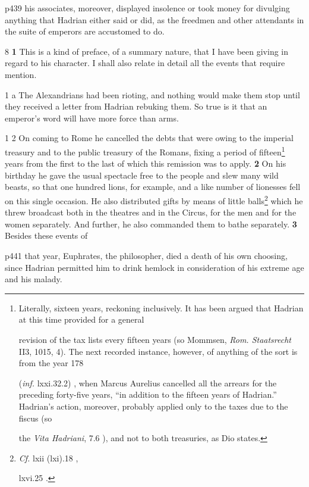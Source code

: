 p439 his associates, moreover, displayed insolence or took money for divulging anything that Hadrian either said or did, as the freedmen and other attendants in the suite of emperors are accustomed to do.

8 \textbf{1} This is a kind of preface, of a summary nature, that I have been giving in regard to his character. I shall also relate in detail all the events that require mention.

1 a The Alexandrians had been rioting, and nothing would make them stop until they received a letter from Hadrian rebuking them. So true is it that an emperor's word will have more force than arms.

1 2 On coming to Rome he cancelled the debts that were owing to the imperial treasury and to the public treasury of the Romans, fixing a period of fifteen\texthebrew{⁠}\footnote{Literally, sixteen years, reckoning inclusively. It has been argued that Hadrian at this time provided for a general

revision of the tax lists every fifteen years (so Mommsen, \emph{Rom. Staatsrecht} II3, 1015, 4). The next recorded instance, however, of anything of the sort is from the year 178

(\emph{inf.} lxxi.32.2) , when Marcus Aurelius cancelled all the arrears for the preceding forty-five years, ``in addition to the fifteen years of Hadrian.'' Hadrian's action, moreover, probably applied only to the taxes due to the fiscus (so

the \emph{Vita Hadriani}, 7.6 ), and not to both treasuries, as Dio states.

} years from the first to the last of which this remission was to apply. \textbf{2} On his birthday he gave the usual spectacle free to the people and slew many wild beasts, so that one hundred lions, for example, and a like number of lionesses fell on this single occasion. He also distributed gifts by means of little balls\texthebrew{⁠}\footnote{\emph{Cf.} lxii (lxi).18 ,

lxvi.25 .

} which he threw broadcast both in the theatres and in the Circus, for the men and for the women separately. And further, he also commanded them to bathe separately. \textbf{3} Besides these events of

p441 that year, Euphrates, the philosopher, died a death of his own choosing, since Hadrian permitted him to drink hemlock in consideration of his extreme age and his malady.

